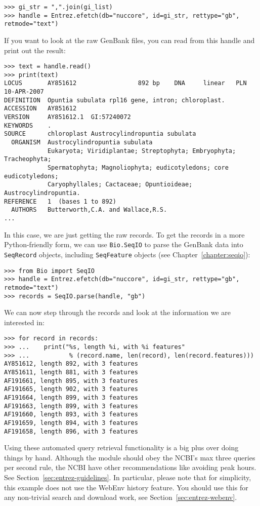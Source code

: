 \begin{verbatim}
>>> gi_str = ",".join(gi_list)
>>> handle = Entrez.efetch(db="nuccore", id=gi_str, rettype="gb", retmode="text")
\end{verbatim}

If you want to look at the raw GenBank files, you can read from this handle and print out the result:

\begin{verbatim}
>>> text = handle.read()
>>> print(text)
LOCUS       AY851612                 892 bp    DNA     linear   PLN 10-APR-2007
DEFINITION  Opuntia subulata rpl16 gene, intron; chloroplast.
ACCESSION   AY851612
VERSION     AY851612.1  GI:57240072
KEYWORDS    .
SOURCE      chloroplast Austrocylindropuntia subulata
  ORGANISM  Austrocylindropuntia subulata
            Eukaryota; Viridiplantae; Streptophyta; Embryophyta; Tracheophyta;
            Spermatophyta; Magnoliophyta; eudicotyledons; core eudicotyledons;
            Caryophyllales; Cactaceae; Opuntioideae; Austrocylindropuntia.
REFERENCE   1  (bases 1 to 892)
  AUTHORS   Butterworth,C.A. and Wallace,R.S.
...
\end{verbatim}

In this case, we are just getting the raw records. To get the records in a more Python-friendly form, we can use \verb+Bio.SeqIO+ to parse the GenBank data into \verb|SeqRecord| objects, including \verb|SeqFeature| objects (see Chapter~\ref{chapter:seqio}):

\begin{verbatim}
>>> from Bio import SeqIO
>>> handle = Entrez.efetch(db="nuccore", id=gi_str, rettype="gb", retmode="text")
>>> records = SeqIO.parse(handle, "gb")
\end{verbatim}

\noindent We can now step through the records and look at the information we are interested in:
\begin{verbatim}
>>> for record in records:
>>> ...    print("%s, length %i, with %i features"
>>> ...           % (record.name, len(record), len(record.features)))
AY851612, length 892, with 3 features
AY851611, length 881, with 3 features
AF191661, length 895, with 3 features
AF191665, length 902, with 3 features
AF191664, length 899, with 3 features
AF191663, length 899, with 3 features
AF191660, length 893, with 3 features
AF191659, length 894, with 3 features
AF191658, length 896, with 3 features
\end{verbatim}

Using these automated query retrieval functionality is a big plus over doing things by hand.   Although the module should obey the NCBI's max three queries per second rule, the NCBI have other recommendations like avoiding peak hours.  See Section~\ref{sec:entrez-guidelines}.
In particular, please note that for simplicity, this example does not use the WebEnv history feature.  You should use this for any non-trivial search and download work, see Section~\ref{sec:entrez-webenv}.


